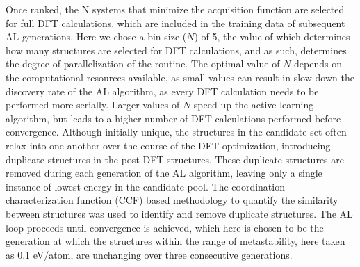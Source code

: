 %
Once ranked, the N systems that minimize the acquisition function are selected for full DFT calculations, which are included in the training data of subsequent AL generations.
%
Here we chose a bin size ($N$) of \num{5}, the value of which determines how many structures are selected for DFT calculations,
and as such, determines the degree of parallelization of the routine.
%
The optimal value of $N$ depends on the computational resources available, as small values can result in slow down the discovery rate of the AL algorithm,
as every DFT calculation needs to be performed more serially.
%
Larger values of $N$ speed up the active-learning algorithm, but leads to a higher number of DFT calculations performed before convergence.
%
Although initially unique, the structures in the candidate set often relax into one another over the course of the DFT optimization, introducing duplicate structures in the post-DFT structures.
%
These duplicate structures are removed during each generation of the AL algorithm, leaving only a single instance of lowest energy in the candidate pool.
%
The coordination characterization function (CCF) based methodology to quantify the similarity between structures was used to identify and remove duplicate structures.\cite{Su2017}
%
The AL loop proceeds until convergence is achieved, which here is chosen to be the generation at which the structures within the range of metastability, here taken as \num{0.1} eV/atom, are unchanging over three consecutive generations.

